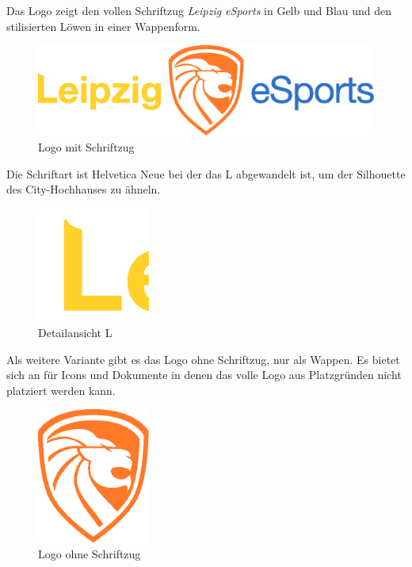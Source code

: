 \documentclass{article}
\begin{document}
Das Logo zeigt den vollen Schriftzug \emph{Leipzig eSports} in Gelb und Blau und den stilisierten Löwen in einer Wappenform.
\begin{figure}[H]
\includegraphics[width=\textwidth]{Docs/Logo.eps}
\caption{Logo mit Schriftzug}
\end{figure}

Die Schriftart ist Helvetica Neue bei der das L abgewandelt ist, um der Silhouette des City-Hochhauses zu ähneln.

\begin{figure}[H]
\centering
\includegraphics[width=0.33\textwidth]{Docs/logo_detail_L.png}
\caption{Detailansicht L}
\end{figure}


Als weitere Variante gibt es das Logo ohne Schriftzug, nur als Wappen. Es bietet sich an für Icons und Dokumente in denen das volle Logo aus Platzgründen nicht platziert werden kann.

\begin{figure}[H]
\centering
\includegraphics[width=0.33\textwidth]{Docs/Emblem.eps}
\caption{Logo ohne Schriftzug}
\end{figure}
\end{document}
